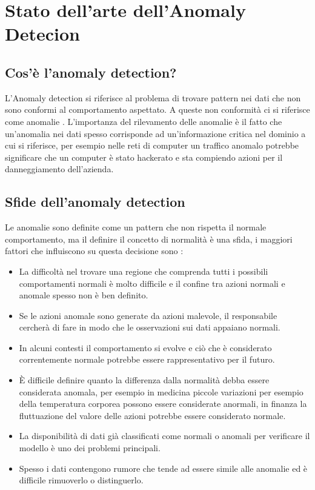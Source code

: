 
\chapter{Stato dell'arte dell'Anomaly Detecion}

\section{Cos'è l'anomaly detection?}


L'Anomaly detection si riferisce al problema di trovare pattern nei dati che non sono conformi al comportamento aspettato. A queste non conformità ci si riferisce come anomalie \cite{anomaly_detection_survey_3}. L'importanza del rilevamento delle anomalie è il fatto che un'anomalia nei dati spesso corrisponde ad un'informazione critica nel dominio a cui si riferisce, per esempio nelle reti di computer un traffico anomalo potrebbe significare che un computer è stato hackerato e sta compiendo azioni per il danneggiamento dell'azienda.

\section{Sfide dell'anomaly detection}

Le anomalie sono definite come un pattern che non rispetta il normale comportamento, ma il definire il concetto di normalità è una sfida, i maggiori fattori che influiscono su questa decisione sono \cite{anomaly_detection_survey_3}:

\begin{itemize}
    \item La difficoltà nel trovare una regione che comprenda tutti i possibili comportamenti normali è molto difficile e il confine tra azioni normali e anomale spesso non è ben definito.
    \item Se le azioni anomale sono generate da azioni malevole, il responsabile cercherà di fare in modo che le osservazioni sui dati appaiano normali.
    \item In alcuni contesti il comportamento si evolve e ciò che è considerato correntemente normale potrebbe essere rappresentativo per il futuro.
    \item È difficile definire quanto la differenza dalla normalità debba essere considerata anomala, per esempio in medicina piccole variazioni per esempio della temperatura corporea possono essere considerate anormali, in finanza la fluttuazione del valore delle azioni potrebbe essere considerato normale.
    \item La disponibilità di dati già classificati come normali o anomali per verificare il modello è uno dei problemi principali.
    \item Spesso i dati contengono rumore che tende ad essere simile alle anomalie ed è difficile rimuoverlo o distinguerlo.
\end{itemize}

